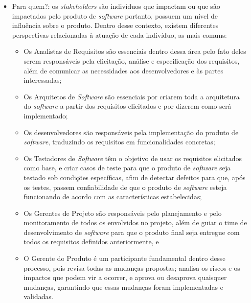 \begin{itemize}
    \item Para quem?: os \textit{stakeholders} são indivíduos que impactam ou que são impactados pelo produto de \textit{software} portanto, possuem um nível de influência sobre o produto. Dentro desse contexto, existem diferentes perspectivas relacionadas à atuação de cada indivíduo, as mais comuns:
    
    \begin{itemize}
        \item Os Analistas de Requisitos são essenciais dentro dessa área pelo fato deles serem responsáveis pela elicitação, análise e especificação dos requisitos, além de comunicar as necessidades aos desenvolvedores e às partes interessadas;
    
        \item Os Arquitetos de \textit{Software} são essenciais por criarem toda a arquitetura do \textit{software} a partir dos requisitos elicitados e por dizerem como será implementado;
    
        \item Os desenvolvedores são responsáveis pela implementação do produto de \textit{software}, traduzindo os requisitos em funcionalidades concretas;
    
        \item Os Testadores de \textit{Software} têm o objetivo de usar os requisitos elicitados como base, e criar casos de teste para que o produto de \textit{software} seja testado sob condições específicas, afim de detectar defeitos para que, após os testes, passem confiabilidade de que o produto de \textit{software} esteja funcionando de acordo com as características estabelecidas;
    
        \item Os Gerentes de Projeto são responsáveis pelo planejamento e pelo monitoramento de todos os envolvidos no projeto, além de guiar o time de desenvolvimento de \textit{software} para que o produto final seja entregue com todos os requisitos definidos anteriormente, e
    
        \item O Gerente do Produto é um participante fundamental dentro desse processo, pois revisa todas as mudanças propostas; analisa os riscos e os impactos que podem vir a ocorrer, e aprova ou desaprova quaisquer mudanças, garantindo que essas mudanças foram implementadas e validadas.
    \end{itemize}
    

\end{itemize}
